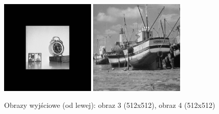 \documentclass[final,a4paper,openany,12pt]{mwbk}
\begin{document}
\begin{figure}[H]
	\begin{center}
		\includegraphics[width=0.4\textwidth]{clock_gray_unificationGeo_result}
		\includegraphics[width=0.4\textwidth]{boat_gray_unificationGeo_result}
	\end{center}
	\caption{Obrazy wyjściowe (od lewej): obraz 3 (512x512), obraz 4 (512x512)}
\end{figure}

\end{document}
